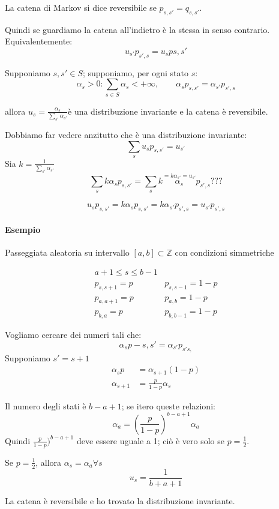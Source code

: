 \documentclass[a4paper,12pt]{book}
\begin{document}
La catena di Markov si dice reversibile se $ p_{s,s'} = q_{s,s'} $. 

Quindi se guardiamo la catena all'indietro è la stessa in senso contrario. Equivalentemente:
$$ u_{s'} p_{s',s} = u_s p{s,s'} $$

Supponiamo $ s,s' \in S $; supponiamo, per ogni stato $ s $:
$$ \alpha_s > 0 : \sum_{s \in S} \alpha_s < + \infty, \qquad \alpha_s p_{s,s'} = \alpha_{s'}p_{s',s} $$ 

allora $ u_s = \frac{\alpha_{s}}{\sum_{s'} \alpha_{s'}} $è una distribuzione invariante e la catena è reversibile. 

Dobbiamo far vedere anzitutto che è una distribuzione invariante:
$$ \sum_{s} u_s p_{s,s'} = u_{s'} $$
Sia $ k = \frac{1}{\sum_{s'}\alpha_{s'}} $
$$ \sum_{s} k\alpha_{s} p_{s,s'} = \sum_{s} k \overset{= k \alpha_{s'} = u_{s'} }{\alpha_{s}} p_{s',s}  ???$$ %

$$ u_s p_{s,s'} = k \alpha_{s} p_{s,s'} = k\alpha_{s'} p_{s',s} = u_{s'} p_{s',s} $$

\paragraph{Esempio} Passeggiata aleatoria su intervallo $ [a, b] \subset \mathbb{Z} $ con condizioni simmetriche

$$ \begin{array}{cc}
	a+1 \le s \le b-1 & \\
	p_{s,s+1} = p & p_{s,s-1} = 1-p \\
	p_{a,a+1} = p & p_{a,b} = 1-p \\
	p_{b,a} = p & p_{b,b-1} = 1-p
\end{array}$$

Vogliamo cercare dei numeri tali che:
	$$ \alpha_{s}p-{s,s'} = \alpha_{s'} p_{s's,} $$
Supponiamo $ s' = s+1 $
\begin{align*}
	\alpha_{s} p & = \alpha_{s+1} (1-p) \\
	\alpha_{s+1} & = \frac{p}{1-p} \alpha_{s}
\end{align*}

Il numero degli stati è $ b-a+1 $; se itero queste relazioni:
$$ \alpha_a = \left(\frac{p}{1-p}\right)^{b-a+1}\alpha_a $$
Quindi $ \frac{p}{1-p})^{b-a+1} $ deve essere uguale a 1; ciò è vero solo se $ p = \frac{1}{2} $.

Se $ p = \frac{1}{2} $, allora $ \alpha_s = \alpha_a \forall s $
$$ u_s = \frac{1}{b+a+1}$$

La catena è reversibile e ho trovato la distribuzione invariante. 
\end{document}
